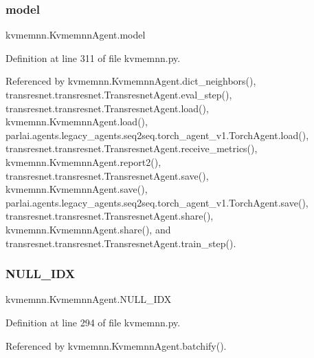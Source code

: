 \subsubsection{\texorpdfstring{model}{model}}
{\footnotesize\ttfamily kvmemnn.\+Kvmemnn\+Agent.\+model}



Definition at line 311 of file kvmemnn.\+py.



Referenced by kvmemnn.\+Kvmemnn\+Agent.\+dict\+\_\+neighbors(), transresnet.\+transresnet.\+Transresnet\+Agent.\+eval\+\_\+step(), transresnet.\+transresnet.\+Transresnet\+Agent.\+load(), kvmemnn.\+Kvmemnn\+Agent.\+load(), parlai.\+agents.\+legacy\+\_\+agents.\+seq2seq.\+torch\+\_\+agent\+\_\+v1.\+Torch\+Agent.\+load(), transresnet.\+transresnet.\+Transresnet\+Agent.\+receive\+\_\+metrics(), kvmemnn.\+Kvmemnn\+Agent.\+report2(), transresnet.\+transresnet.\+Transresnet\+Agent.\+save(), kvmemnn.\+Kvmemnn\+Agent.\+save(), parlai.\+agents.\+legacy\+\_\+agents.\+seq2seq.\+torch\+\_\+agent\+\_\+v1.\+Torch\+Agent.\+save(), transresnet.\+transresnet.\+Transresnet\+Agent.\+share(), kvmemnn.\+Kvmemnn\+Agent.\+share(), and transresnet.\+transresnet.\+Transresnet\+Agent.\+train\+\_\+step().

\mbox{\label{classkvmemnn_1_1KvmemnnAgent_afdba3b0e989e4da5dac9024a911c8716}} 
\subsubsection{\texorpdfstring{N\+U\+L\+L\+\_\+\+I\+DX}{NULL\_IDX}}
{\footnotesize\ttfamily kvmemnn.\+Kvmemnn\+Agent.\+N\+U\+L\+L\+\_\+\+I\+DX}



Definition at line 294 of file kvmemnn.\+py.



Referenced by kvmemnn.\+Kvmemnn\+Agent.\+batchify().

\mbox{\label{classkvmemnn_1_1KvmemnnAgent_a35de1b119d32bdc99bedbae205fd1555}} 
